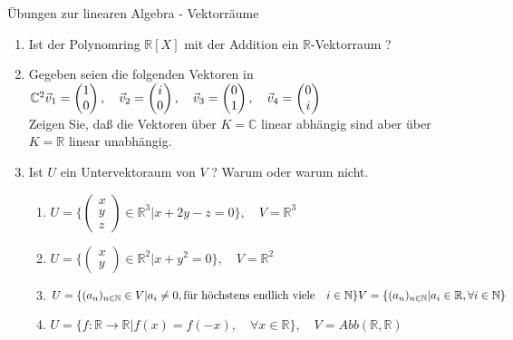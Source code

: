 \documentclass[a4paper]{article}
\begin{document}
Übungen zur linearen Algebra - Vektorräume
\begin{enumerate}
\item Ist der Polynomring $\mathbb R[X]$ mit der Addition ein $\mathbb R$-Vektorraum ?
\item Gegeben seien die folgenden Vektoren in $\mathbb C^2 \\
\vec{v}_1 = \begin{pmatrix} 1 \\ 0 \end{pmatrix}, \quad \vec{v}_2 = \begin{pmatrix} i \\ 0 \end{pmatrix}, \quad \vec{v}_3 = \begin{pmatrix} 0 \\ 1 \end{pmatrix}, \quad \vec{v}_4 = \begin{pmatrix} 0 \\ i \end{pmatrix}$ \\
Zeigen Sie, daß die Vektoren über $K = \mathbb  C$ linear abhängig sind aber über $K = \mathbb R$ linear unabhängig.
\item Ist $U$ ein Untervektoraum von $V$ ? Warum oder warum nicht.
\begin{enumerate}
\item $ U = \{ \begin{pmatrix} x \\ y \\ z \end{pmatrix} \in \mathbb R^3 | x + 2 y- z = 0 \} , \quad V = \mathbb R^3 $
\item $ U = \{ \begin{pmatrix} x \\ y \end{pmatrix} \in \mathbb R^2 | x + y^2 = 0 \} , \quad V = \mathbb R^2 $
\item $  
        U = \{ (a_n)_{n \in \mathbb N} \in V | a_i \neq 0, \textrm{für höchstens endlich viele}\quad  i \in \mathbb N  \}   \\
        V =  \{ (a_n)_{n \in \mathbb N} | a_i \in \mathbb R, \forall i \in \mathbb N \} $
\item $ U = \{ f : \mathbb R \rightarrow \mathbb R | f(x) = f(-x), \quad\forall x \in \mathbb R \} , \quad V = Abb( \mathbb R, \mathbb R)$
        

\end{enumerate}
\end{enumerate}
\end{document}
